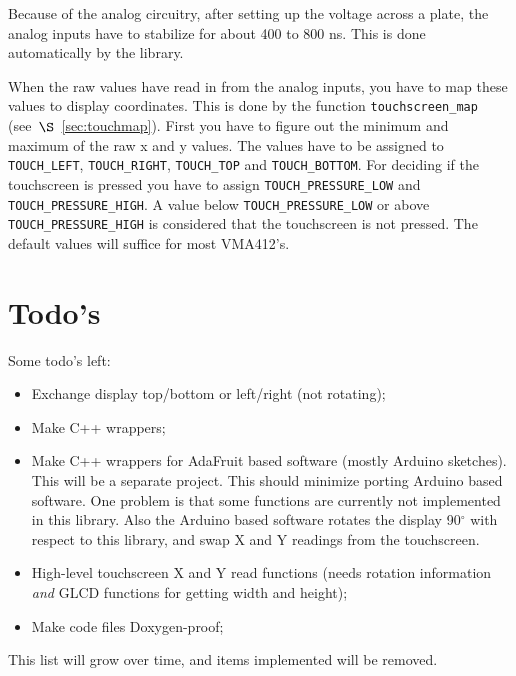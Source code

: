 \documentclass[12pt]{article}
\begin{document}
Because of the analog circuitry, after setting up the voltage across a plate, the analog inputs have to stabilize for about 400 to 800 ns. This is done automatically by the library.

When the raw values have read in from the analog inputs, you have to map these values to display coordinates. This is done by the function \lstinline|touchscreen_map| (see~$\S$~\ref{sec:touchmap}). First you have to figure out the minimum and maximum of the raw x and y values. The values have to be assigned to \lstinline|TOUCH_LEFT|, \lstinline|TOUCH_RIGHT|, \lstinline|TOUCH_TOP| and \lstinline|TOUCH_BOTTOM|. For deciding if the touchscreen is pressed you have to assign \lstinline|TOUCH_PRESSURE_LOW| and \lstinline|TOUCH_PRESSURE_HIGH|. A value below \lstinline|TOUCH_PRESSURE_LOW| or above \lstinline|TOUCH_PRESSURE_HIGH| is considered that the touchscreen is not pressed. The default values will suffice for most VMA412's.

\section{Todo's}
Some todo's left:

\begin{itemize}
\item Exchange display top/bottom or left/right (not rotating);
\item Make C++ wrappers;
\item Make C++ wrappers for AdaFruit based software (mostly Arduino sketches). This will be a separate project. This should minimize porting Arduino based software. One problem is that some functions are currently not implemented in this library. Also the Arduino based software rotates the display 90$^\circ$ with respect to this library, and swap X and Y readings from the touchscreen.
\item High-level touchscreen X and Y read functions (needs rotation information \textsl{and} GLCD functions for getting width and height);
\item Make code files Doxygen-proof;
\end{itemize}

This list will grow over time, and items implemented will be removed.

{}

\printindex
\end{document}
